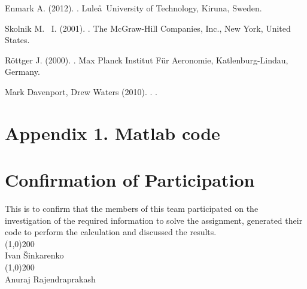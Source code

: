 \documentclass{article}
\def\authorivan{Ivan \v Sinkarenko}
\def\authoranu{Anuraj Rajendraprakash}
\begin{document}
\newpage
\begin{thebibliography}{9}

Enmark A.  (2012).
.
\newblock Lule\aa \ University of Technology, Kiruna, Sweden.

Skolnik M. ~I.  (2001).
.
\newblock The McGraw-Hill Companies, Inc., New York, United States.

R\"ottger J.  (2000).
.
\newblock Max Planck Institut F\"ur Aeronomie, Katlenburg-Lindau, Germany.

Mark Davenport, Drew Waters (2010).
.
.

\end{thebibliography}


\newpage
\section{Appendix 1. Matlab code}
%

\newpage
\section{Confirmation of Participation}

This is to confirm that the members of this team participated on the investigation of the required information to solve the assignment, generated their code to perform the calculation and discussed the results.\\
\vspace{2cm}
\newline
\line(1,0){200}\\
\authorivan\\
\vspace{2cm}
\newline
\line(1,0){200}\\
\authoranu\\
\end{document}
